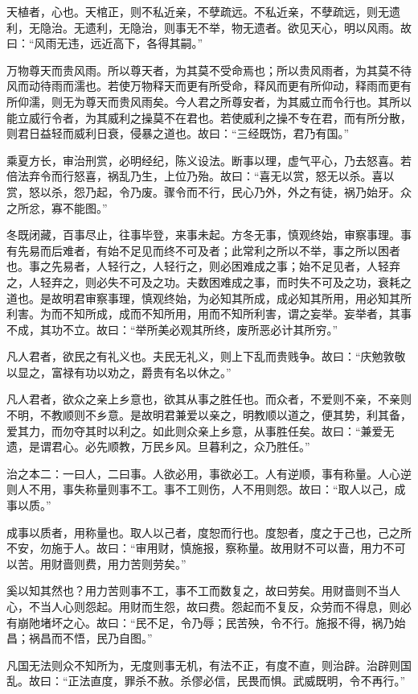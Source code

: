 \documentclass[]{article}
\begin{document}
天植者，心也。天棺正，则不私近亲，不孽疏远。不私近亲，不孽疏远，则无遗利，无隐治。无遗利，无隐治，则事无不举，物无遗者。欲见天心，明以风雨。故曰：``风雨无违，远近高下，各得其嗣。''

万物尊天而贵风雨。所以尊天者，为其莫不受命焉也；所以贵风雨者，为其莫不待风而动待雨而濡也。若使万物释天而更有所受命，释风而更有所仰动，释雨而更有所仰濡，则无为尊天而贵风雨矣。今人君之所尊安者，为其威立而令行也。其所以能立威行令者，为其威利之操莫不在君也。若使威利之操不专在君，而有所分散，则君日益轻而威利日衰，侵暴之道也。故曰：``三经既饬，君乃有国。''

乘夏方长，审治刑赏，必明经纪，陈义设法。断事以理，虚气平心，乃去怒喜。若倍法弃令而行怒喜，祸乱乃生，上位乃殆。故曰：``喜无以赏，怒无以杀。喜以赏，怒以杀，怨乃起，令乃废。骤令而不行，民心乃外，外之有徒，祸乃始牙。众之所忿，寡不能图。''

冬既闭藏，百事尽止，往事毕登，来事未起。方冬无事，慎观终始，审察事理。事有先易而后难者，有始不足见而终不可及者；此常利之所以不举，事之所以困者也。事之先易者，人轻行之，人轻行之，则必困难成之事；始不足见者，人轻弃之，人轻弃之，则必失不可及之功。夫数困难成之事，而时失不可及之功，衰耗之道也。是故明君审察事理，慎观终始，为必知其所成，成必知其所用，用必知其所利害。为而不知所成，成而不知所用，用而不知所利害，谓之妄举。妄举者，其事不成，其功不立。故曰：``举所美必观其所终，废所恶必计其所穷。''

凡人君者，欲民之有礼义也。夫民无礼义，则上下乱而贵贱争。故曰：``庆勉敦敬以显之，富禄有功以劝之，爵贵有名以休之。''

凡人君者，欲众之亲上乡意也，欲其从事之胜任也。而众者，不爱则不亲，不亲则不明，不教顺则不乡意。是故明君兼爱以亲之，明教顺以道之，便其势，利其备，爱其力，而勿夺其时以利之。如此则众亲上乡意，从事胜任矣。故曰：``兼爱无遗，是谓君心。必先顺教，万民乡风。旦暮利之，众乃胜任。''

治之本二：一曰人，二曰事。人欲必用，事欲必工。人有逆顺，事有称量。人心逆则人不用，事失称量则事不工。事不工则伤，人不用则怨。故曰：``取人以己，成事以质。''

成事以质者，用称量也。取人以己者，度恕而行也。度恕者，度之于己也，己之所不安，勿施于人。故曰：``审用财，慎施报，察称量。故用财不可以啬，用力不可以苦。用财啬则费，用力苦则劳矣。''

奚以知其然也？用力苦则事不工，事不工而数复之，故曰劳矣。用财啬则不当人心，不当人心则怨起。用财而生怨，故曰费。怨起而不复反，众劳而不得息，则必有崩阤堵坏之心。故曰：``民不足，令乃辱；民苦殃，令不行。施报不得，祸乃始昌；祸昌而不悟，民乃自图。''

凡国无法则众不知所为，无度则事无机，有法不正，有度不直，则治辟。治辟则国乱。故曰：``正法直度，罪杀不赦。杀僇必信，民畏而惧。武威既明，令不再行。''
\end{document}
